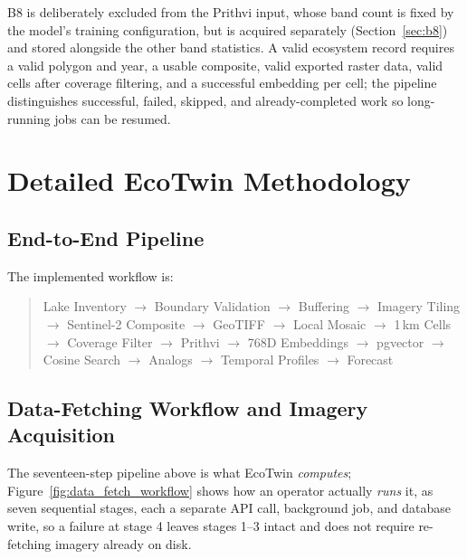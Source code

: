 \documentclass[12pt,a4paper,oneside]{report}
\begin{document}
B8 is deliberately excluded from the Prithvi input, whose band count
is fixed by the model's training configuration, but is acquired
separately (Section~\ref{sec:b8}) and stored alongside the other
band statistics. A valid ecosystem record requires a valid polygon
and year, a usable composite, valid exported raster data, valid
cells after coverage filtering, and a successful embedding per cell;
the pipeline distinguishes successful, failed, skipped, and
already-completed work so long-running jobs can be resumed.


\chapter{Detailed EcoTwin Methodology}
\label{chap:methodology}

\section{End-to-End Pipeline}

The implemented workflow is:

\begin{quote}
\small\centering
Lake Inventory $\rightarrow$ Boundary Validation $\rightarrow$
Buffering $\rightarrow$ Imagery Tiling $\rightarrow$ Sentinel-2
Composite $\rightarrow$ GeoTIFF $\rightarrow$ Local Mosaic
$\rightarrow$ 1\,km Cells $\rightarrow$ Coverage Filter $\rightarrow$
Prithvi $\rightarrow$ 768D Embeddings $\rightarrow$ pgvector
$\rightarrow$ Cosine Search $\rightarrow$ Analogs $\rightarrow$
Temporal Profiles $\rightarrow$ Forecast
\end{quote}

\section{Data-Fetching Workflow and Imagery Acquisition}
\label{sec:data_fetch_workflow}

The seventeen-step pipeline above is what EcoTwin \emph{computes};
Figure~\ref{fig:data_fetch_workflow} shows how an operator actually
\emph{runs} it, as seven sequential stages, each a separate API
call, background job, and database write, so a failure at stage 4
leaves stages 1--3 intact and does not require re-fetching imagery
already on disk.
\end{document}
